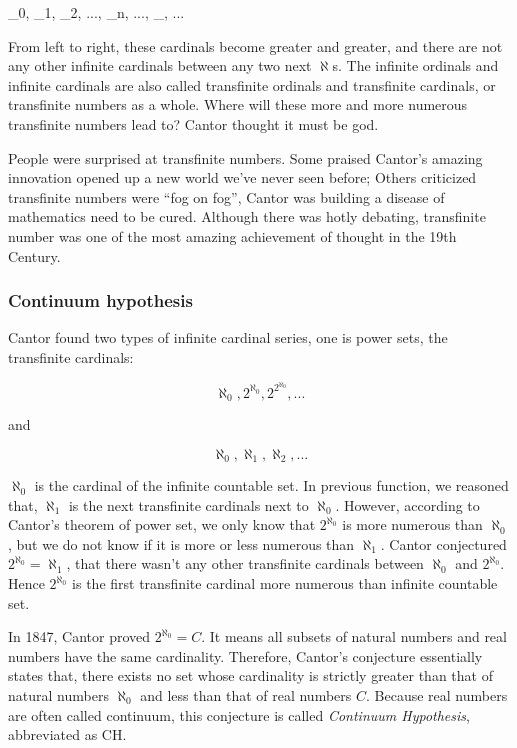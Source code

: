 \documentclass{article}
\begin{document}
\be
\aleph_0, \aleph_1, \aleph_2, ..., \aleph_n, ..., \aleph_{\omega}, ...
\ee

From left to right, these cardinals become greater and greater, and there are not any other infinite cardinals between any two next $\aleph$s. The infinite ordinals and infinite cardinals are also called transfinite ordinals and transfinite cardinals, or transfinite numbers as a whole. Where will these more and more numerous transfinite numbers lead to? Cantor thought it must be god.

People were surprised at transfinite numbers. Some praised Cantor's amazing innovation opened up a new world we've never seen before; Others criticized transfinite numbers were ``fog on fog'', Cantor was building a disease of mathematics need to be cured. Although there was hotly debating, transfinite number was one of the most amazing achievement of thought in the 19th Century.

\subsubsection{Continuum hypothesis}
  
Cantor found two types of infinite cardinal series, one is power sets, the transfinite cardinals:

\[
\aleph_0, 2^{\aleph_0}, 2^{2^{\aleph_0}}, ...
\]

and

\[
\aleph_0, \aleph_1, \aleph_2, ...
\]

$\aleph_0$ is the cardinal of the infinite countable set. In previous function, we reasoned that, $\aleph_1$ is the next transfinite cardinals next to $\aleph_0$. However, according to Cantor's theorem of power set, we only know that $2^{\aleph_0}$ is more numerous than $\aleph_0$, but we do not know if it is more or less numerous than $\aleph_1$. Cantor conjectured $2^{\aleph_0} = \aleph_1$, that there wasn't any other transfinite cardinals between $\aleph_0$ and $2^{\aleph_0}$. Hence $2^{\aleph_0}$ is the first transfinite cardinal more numerous than infinite countable set.

In 1847, Cantor proved $2^{\aleph_0} = C$. It means all subsets of natural numbers and real numbers have the same cardinality. Therefore, Cantor's conjecture essentially states that, there exists no set whose cardinality is strictly greater than that of natural numbers $\aleph_0$ and less than that of real numbers $C$. Because real numbers are often called continuum, this conjecture is called {\em Continuum Hypothesis}, abbreviated as CH.
\end{document}
